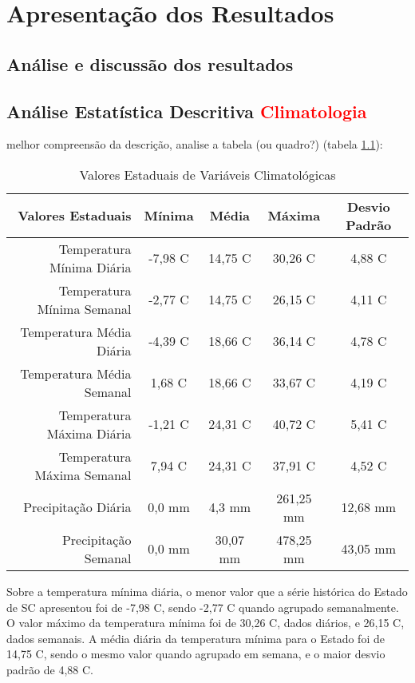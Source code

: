 \chapter{Apresentação dos Resultados}

\section{Análise e discussão dos resultados}

\section{Análise Estatística Descritiva \textcolor{red}{Climatologia}}

\Para melhor compreensão da descrição, analise a tabela (ou quadro?) (tabela \ref{tab:valores_climato}):

\begin{table}
    \centering
    \caption{Valores Estaduais de Variáveis Climatológicas}
    \begin{tabular}{|r|cccc|}
    \hline
        Valores Estaduais & Mínima & Média & Máxima & Desvio Padrão\\
    \hline
    Temperatura Mínima Diária & -7,98 C & 14,75 C& 30,26 C & 4,88 C\\
    Temperatura Mínima Semanal & -2,77 C & 14,75 C & 26,15 C & 4,11 C\\
    Temperatura Média Diária & -4,39 C & 18,66 C & 36,14 C & 4,78 C\\
    Temperatura Média Semanal & 1,68 C & 18,66 C & 33,67 C & 4,19 C\\
    Temperatura Máxima Diária & -1,21 C & 24,31 C & 40,72 C & 5,41 C\\
    Temperatura Máxima Semanal & 7,94 C & 24,31 C & 37,91 C & 4,52 C\\ 
    Precipitação Diária & 0,0 mm & 4,3 mm & 261,25 mm & 12,68 mm\\
    Precipitação Semanal & 0,0 mm & 30,07 mm & 478,25 mm & 43,05 mm\\
    \hline
    \end{tabular}
    \label{tab:valores_climato}
\end{table}

\indent Sobre a temperatura mínima diária, o menor valor que a série histórica do Estado de \acrshort{SC} apresentou foi de -7,98 C, sendo -2,77 C quando agrupado semanalmente. O valor máximo da temperatura mínima foi de 30,26 C, dados diários, e 26,15 C, dados semanais. A média diária da temperatura mínima para o Estado foi de 14,75 C, sendo o mesmo valor quando agrupado em semana, e o maior desvio padrão de 4,88 C.

